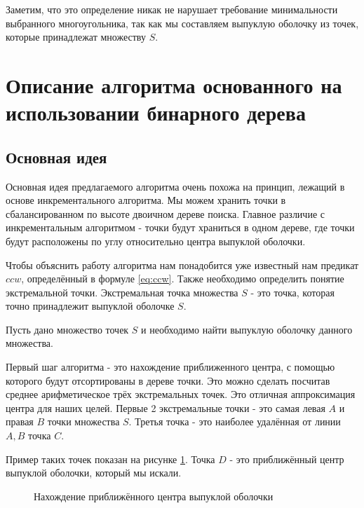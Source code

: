 Заметим, что это определение никак не нарушает требование минимальности выбранного многоугольника, так как мы составляем выпуклую оболочку из точек, которые принадлежат множеству $S$.

\section{Описание алгоритма основанного на использовании бинарного дерева} \label{sect2_2}

\subsection{Основная идея} \label{subsect2_2_1}

Основная идея предлагаемого алгоритма очень похожа на принцип, лежащий в основе инкрементального алгоритма. Мы можем хранить точки в сбалансированном по высоте двоичном дереве поиска. Главное различие с инкрементальным алгоритмом - точки будут храниться в одном дереве, где точки будут расположены по углу относительно центра выпуклой оболочки.

Чтобы объяснить работу алгоритма нам понадобится уже известный нам предикат $ccw$, определённый в формуле \ref{eq:ccw}. Также необходимо определить понятие экстремальной точки. Экстремальная точка множества $S$ - это точка, которая точно принадлежит выпуклой оболочке $S$.

Пусть дано множество точек $S$ и необходимо найти выпуклую оболочку данного множества.

Первый шаг алгоритма - это нахождение приближенного центра, с помощью которого будут отсортированы в дереве точки. Это можно сделать посчитав среднее арифметическое трёх экстремальных точек. Это отличная аппроксимация центра для наших целей. Первые 2 экстремальные точки -  это самая левая $A$ и правая $B$ точки множества $S$. Третья точка - это наиболее удалённая от линии $A, B$ точка $C$.

Пример таких точек показан на рисунке \ref{img:my_extreme_points}. Точка $D$ - это приближённый центр выпуклой оболочки, который мы искали.

\begin{figure}[H]
	{\centering
		\hfill
		\hfill
		\hfill
	}
	\caption{Нахождение приближённого центра выпуклой оболочки}
	\label{img:my_extreme_points}
\end{figure}

